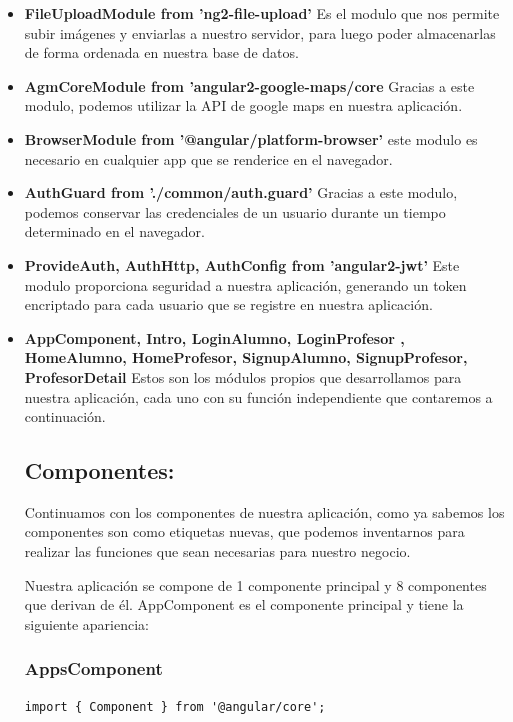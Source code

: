 \begin{itemize}
\item \textbf{FileUploadModule from 'ng2-file-upload'} Es el modulo que nos permite subir imágenes y enviarlas a nuestro servidor, para luego poder almacenarlas de forma ordenada en nuestra base de datos.

\item \textbf{AgmCoreModule from 'angular2-google-maps/core} Gracias a este modulo, podemos utilizar la API de google maps en nuestra aplicación.

\item \textbf{ BrowserModule from '@angular/platform-browser'} este modulo es necesario en cualquier app que se renderice en el navegador.


\item \textbf{ AuthGuard from './common/auth.guard'} Gracias a este modulo, podemos conservar las credenciales de un usuario durante un tiempo determinado en el navegador.

\item \textbf{ ProvideAuth, AuthHttp, AuthConfig from 'angular2-jwt'} Este modulo proporciona seguridad a nuestra aplicación, generando un token encriptado para cada usuario que se registre en nuestra aplicación.

\item \textbf{AppComponent, Intro, LoginAlumno, LoginProfesor , HomeAlumno, HomeProfesor, SignupAlumno, SignupProfesor, ProfesorDetail } Estos son los módulos propios que desarrollamos para nuestra aplicación, cada uno con su función independiente que contaremos a continuación.

\subsection{Componentes: }

Continuamos con los componentes de nuestra aplicación, como ya sabemos los componentes son como etiquetas nuevas, que podemos inventarnos para realizar las funciones que sean necesarias para nuestro negocio. 

Nuestra aplicación se compone de 1 componente principal y 8 componentes que derivan de él. AppComponent es el componente principal y tiene la siguiente apariencia:

\subsubsection{AppsComponent }
\begin{lstlisting}
import { Component } from '@angular/core';


\end{lstlisting}
\end{itemize}
